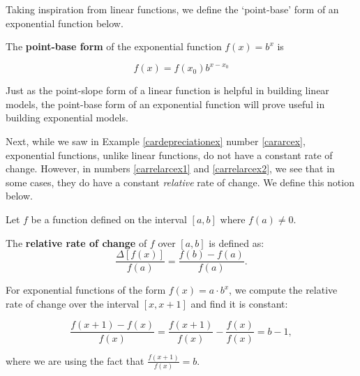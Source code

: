 \documentclass{ximera}
\begin{document}
 

Taking inspiration from linear functions, we define the `point-base' form of an exponential function below.

 


\begin{definition} \label{expfcnpointbaseform}  The   \textbf{point-base form} of the exponential function $f(x) = b^{x}$  is

\[ f(x) = f(x_{0}) b^{x - x_{0}} \]


\end{definition}


 

Just as the point-slope form of a linear function is helpful in building linear models, the point-base form of an exponential function will prove useful in building exponential models.

 

Next, while we saw in Example \ref{cardepreciationex} number \ref{cararcex}, exponential functions, unlike linear functions, do not have a constant rate of change.  However, in numbers \ref{carrelarcex1} and \ref{carrelarcex2}, we see that in some cases, they do have a constant \textit{relative} rate of change.  We define this notion below.

 



\begin{definition} \label{rrc}  Let $f$ be a function defined on the interval $[a,b]$ where $f(a) \neq 0$.

The \textbf{relative rate of  change}  of $f$ over $[a,b]$ is defined as: \[ \frac{\Delta [f(x)] }{f(a)} = \frac{f(b) - f(a)}{f(a)} .\]

\end{definition}


 

For exponential functions of the form $f(x) = a \cdot b^{x}$, we compute the relative rate of change over the interval $[x, x+1]$ and find it is constant:

\[ \frac{f(x+1) - f(x)}{f(x)} = \frac{f(x+1)}{f(x)} - \frac{f(x)}{f(x)} = b -1,\]

where we are using the fact that $\frac{f(x+1)}{f(x)} = b$. 
\end{document}
